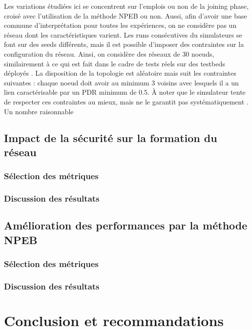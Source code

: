 \documentclass[]{report}
\begin{document}
Les variations étudiées ici se concentrent sur l'emplois ou non de la joining phase, croisé avec l'utilisation de la méthode NPEB ou non. Aussi, afin d'avoir une base commune d'interprétation pour toutes les expériences, on ne considère pas un réseau dont les caractéristiques varient. Les runs consécutives du simulateurs se font sur des seeds différents, mais il est possible d'imposer des contraintes sur la configuration du réseau. Ainsi, on considère des réseaux de 30 noeuds, similairement à ce qui est fait dans le cadre de tests réels sur des testbeds déployés \cite{openbenchmark}. La disposition de la topologie est aléatoire mais suit les contraintes suivantes : chaque noeud doit avoir au minimum 3 voisins avec lesquels il a un lien caractérisable par un PDR minimum de 0.5. À noter que le simulateur tente de respecter ces contraintes au mieux, mais ne le garantit pas systématiquement \cite{simulating-6TiSCH}. Un nombre raisonnable 

\section{Impact de la sécurité sur la formation du réseau}

\subsection{Sélection des métriques}

\subsection{Discussion des résultats}

\section{Amélioration des performances par la méthode NPEB}
\label{eval_NPEB}


\subsection{Sélection des métriques}

\subsection{Discussion des résultats}


\chapter*{Conclusion et recommandations}





\end{document}
